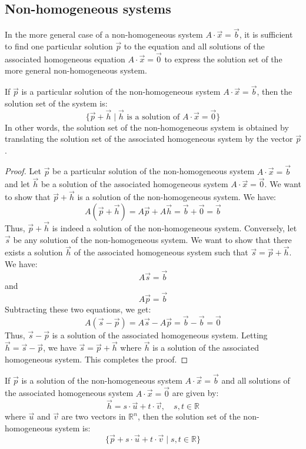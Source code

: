 \subsection{Non-homogeneous systems}
In the more general case of a non-homogeneous system $A \cdot \vec{x} = \vec{b}$, it is sufficient to find one particular solution $\vec{p}$ to the equation and all solutions of the associated homogeneous equation $A \cdot \vec{x} = \vec{0}$ to express the solution set of the more general non-homogeneous system.
\begin{theorem}
    If $\vec{p}$ is a particular solution of the non-homogeneous system $A \cdot \vec{x} = \vec{b}$, then the solution set of the system is:
    \[
        \{ \vec{p} + \vec{h} \mid \vec{h} \text{ is a solution of } A \cdot \vec{x} = \vec{0} \}
    \]
    In other words, the solution set of the non-homogeneous system is obtained by translating the solution set of the associated homogeneous system by the vector $\vec{p}$.
\end{theorem}
\begin{proof}
    Let $\vec{p}$ be a particular solution of the non-homogeneous system $A \cdot \vec{x} = \vec{b}$ and let $\vec{h}$ be a solution of the associated homogeneous system $A \cdot \vec{x} = \vec{0}$. We want to show that $\vec{p} + \vec{h}$ is a solution of the non-homogeneous system. We have:
    \[
        A(\vec{p} + \vec{h}) = A\vec{p} + A\vec{h} = \vec{b} + \vec{0} = \vec{b}
    \]
    Thus, $\vec{p} + \vec{h}$ is indeed a solution of the non-homogeneous system. Conversely, let $\vec{s}$ be any solution of the non-homogeneous system. We want to show that there exists a solution $\vec{h}$ of the associated homogeneous system such that $\vec{s} = \vec{p} + \vec{h}$. We have:
    \[
        A\vec{s} = \vec{b}
    \]
    and
    \[
        A\vec{p} = \vec{b}
    \]
    Subtracting these two equations, we get:
    \[
        A(\vec{s} - \vec{p}) = A\vec{s} - A\vec{p} = \vec{b} - \vec{b} = \vec{0}
    \]
    Thus, $\vec{s} - \vec{p}$ is a solution of the associated homogeneous system. Letting $\vec{h} = \vec{s} - \vec{p}$, we have $\vec{s} = \vec{p} + \vec{h}$ where $\vec{h}$ is a solution of the associated homogeneous system. This completes the proof.
\end{proof}

\begin{eg}
    If $\vec{p}$ is a solution of the non-homogeneous system $A \cdot \vec{x} = \vec{b}$ and all solutions of the associated homogeneous system $A \cdot \vec{x} = \vec{0}$ are given by:
    \[
        \vec{h} = s \cdot \vec{u} + t \cdot \vec{v}, \quad s, t \in \mathbb{R}
    \]
    where $\vec{u}$ and $\vec{v}$ are two vectors in $\mathbb{R}^n$, then the solution set of the non-homogeneous system is:
    \[
        \{ \vec{p} + s \cdot \vec{u} + t \cdot \vec{v} \mid s, t \in \mathbb{R} \}
    \]
\end{eg}

